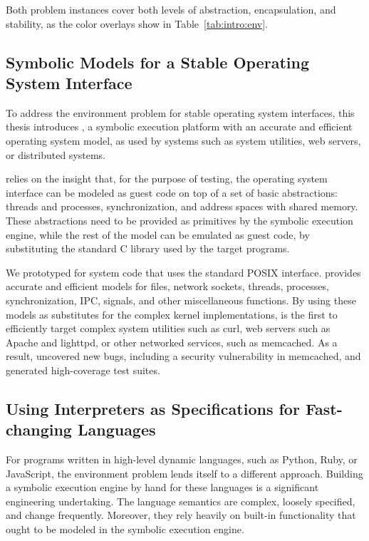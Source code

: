 Both problem instances cover both levels of abstraction, encapsulation, and stability, as the color overlays show in Table~\ref{tab:intro:env}.

\subsection{Symbolic Models for a Stable Operating System Interface}

To address the environment problem for stable operating system interfaces, this thesis introduces \cnine, a symbolic execution platform with an accurate and efficient operating system model, as used by systems such as system utilities, web servers, or distributed systems.

\cnine relies on the insight that, for the purpose of testing, the operating system interface can be modeled as guest code on top of a set of basic abstractions: threads and processes, synchronization, and address spaces with shared memory.
%
These abstractions need to be provided as primitives by the symbolic execution engine, while the rest of the model can be emulated as guest code, by substituting the standard C library used by the target programs.

We prototyped \cnine for system code that uses the standard POSIX interface.  \cnine provides accurate and efficient models for files, network sockets, threads, processes, synchronization, IPC, signals, and other miscellaneous functions.
%
By using these models as substitutes for the complex kernel implementations, \cnine is the first to efficiently target complex system utilities such as \textsf{curl}, web servers such as Apache and lighttpd, or other networked services, such as memcached.
%
As a result, \cnine uncovered new bugs, including a security vulnerability in memcached, and generated high-coverage test suites.


\subsection{Using Interpreters as Specifications for Fast-changing Languages}

For programs written in high-level dynamic languages, such as Python, Ruby, or JavaScript, the environment problem lends itself to a different approach.
%
Building a symbolic execution engine by hand for these languages is a significant engineering undertaking.  The language semantics are complex, loosely specified, and change frequently.  Moreover, they rely heavily on built-in functionality that ought to be modeled in the symbolic execution engine.

